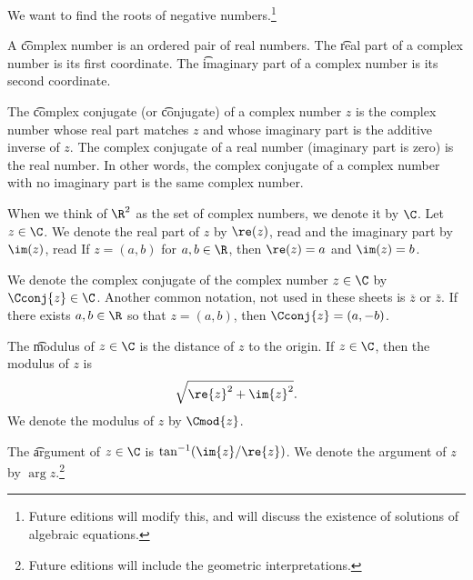 

We want to find the roots of negative numbers.\footnote{Future editions will modify this, and will discuss the existence of solutions of algebraic equations.}


A \t{complex number} is an ordered pair of real numbers.
The \t{real part} of a complex number is its first coordinate.
The \t{imaginary part} of a complex number is its second coordinate.

The \t{complex conjugate} (or \t{conjugate}) of a complex number $z$ is the complex number whose real part matches $z$ and whose imaginary part is the additive inverse of $z$.
The complex conjugate of a real number (imaginary part is zero) is the real number.
In other words, the complex conjugate of a complex number with no imaginary part is the same complex number.


When we think of $\R^2$ as the set of complex numbers, we denote it by $\C$.
Let $z \in \C$.
We denote the real part of $z$ by $\re(z)$, read  and the imaginary part by $\im(z)$, read 
If $z = (a, b)$ for $a, b \in \R$, then $\re(z) = a$ and $\im(z) = b$.

We denote the complex conjugate of the complex number $z \in \C$ by $\Cconj{z} \in \C$.
Another common notation, not used in these sheets is $\overline{z}$ or $\bar{z}$.
If there exists $a, b \in \R$ so that $z = (a, b)$, then $\Cconj{z} = (a, -b)$.


The \t{modulus} of $z \in \C$ is the distance of $z$ to the origin.
If $z \in \C$, then the modulus of $z$ is
\[
  \sqrt{\re{z}^2 + \im{z}^2}.
\]
We denote the modulus of $z$ by $\Cmod{z}$. 

The \t{argument} of $z \in \C$ is $\tan^{-1}(\im{z}/\re{z})$.
We denote the argument of $z$ by $\arg z$.\footnote{Future editions will include the geometric interpretations.}

\blankpage
